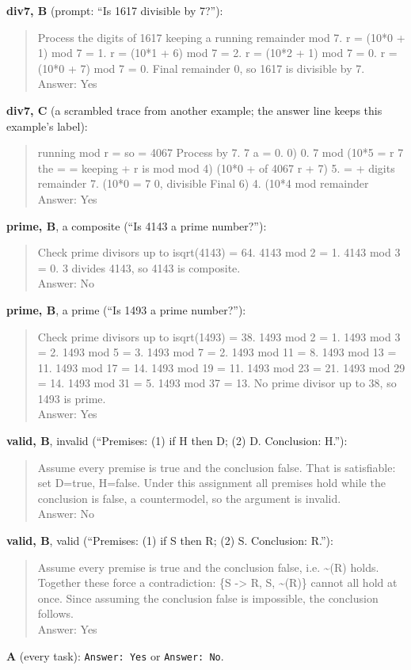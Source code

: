 \documentclass{article}
\theoremstyle{definition}
\begin{document}
\begin{small}
\noindent\textbf{div7, B} (prompt: ``Is 1617 divisible by 7?''):
\begin{quote}\ttfamily\raggedright
Process the digits of 1617 keeping a running remainder mod 7. r = (10*0 + 1) mod 7 = 1. r = (10*1 + 6) mod 7 = 2. r = (10*2 + 1) mod 7 = 0. r = (10*0 + 7) mod 7 = 0. Final remainder 0, so 1617 is divisible by 7.\\Answer: Yes
\end{quote}
\noindent\textbf{div7, C} (a scrambled trace from another example; the answer line keeps this example's label):
\begin{quote}\ttfamily\raggedright
running mod r = so = 4067 Process by 7. 7 a = 0. 0) 0. 7 mod (10*5 = r 7 the = = keeping + r is mod mod 4) (10*0 + of 4067 r + 7) 5. = + digits remainder 7. (10*0 = 7 0, divisible Final 6) 4. (10*4 mod remainder\\Answer: Yes
\end{quote}
\noindent\textbf{prime, B}, a composite (``Is 4143 a prime number?''):
\begin{quote}\ttfamily\raggedright
Check prime divisors up to isqrt(4143) = 64. 4143 mod 2 = 1. 4143 mod 3 = 0. 3 divides 4143, so 4143 is composite.\\Answer: No
\end{quote}
\noindent\textbf{prime, B}, a prime (``Is 1493 a prime number?''):
\begin{quote}\ttfamily\raggedright
Check prime divisors up to isqrt(1493) = 38. 1493 mod 2 = 1. 1493 mod 3 = 2. 1493 mod 5 = 3. 1493 mod 7 = 2. 1493 mod 11 = 8. 1493 mod 13 = 11. 1493 mod 17 = 14. 1493 mod 19 = 11. 1493 mod 23 = 21. 1493 mod 29 = 14. 1493 mod 31 = 5. 1493 mod 37 = 13. No prime divisor up to 38, so 1493 is prime.\\Answer: Yes
\end{quote}
\noindent\textbf{valid, B}, invalid (``Premises: (1) if H then D; (2) D. Conclusion: H.''):
\begin{quote}\ttfamily\raggedright
Assume every premise is true and the conclusion false. That is satisfiable: set D=true, H=false. Under this assignment all premises hold while the conclusion is false, a countermodel, so the argument is invalid.\\Answer: No
\end{quote}
\noindent\textbf{valid, B}, valid (``Premises: (1) if S then R; (2) S. Conclusion: R.''):
\begin{quote}\ttfamily\raggedright
Assume every premise is true and the conclusion false, i.e. \textasciitilde(R) holds. Together these force a contradiction: \{S -> R, S, \textasciitilde(R)\} cannot all hold at once. Since assuming the conclusion false is impossible, the conclusion follows.\\Answer: Yes
\end{quote}
\noindent\textbf{A} (every task): \texttt{Answer: Yes} or \texttt{Answer: No}.
\end{small}
\end{document}

